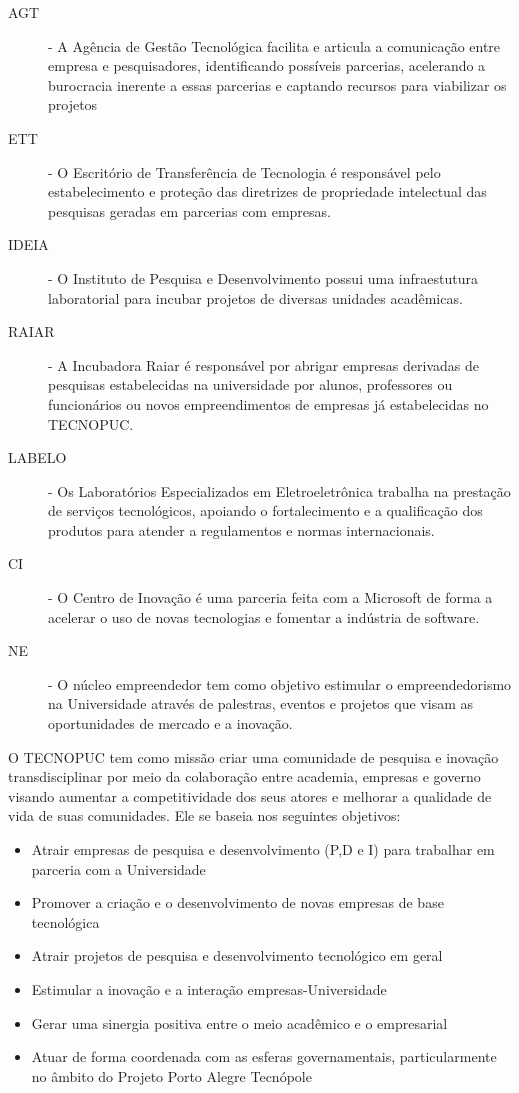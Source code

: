 \begin{description}
\item[AGT] - A Agência de Gestão Tecnológica facilita e articula a comunicação entre empresa e pesquisadores, identificando possíveis parcerias, acelerando a burocracia inerente a essas parcerias e captando recursos para viabilizar os projetos
\item[ETT] - O Escritório de Transferência de Tecnologia é responsável pelo estabelecimento e proteção das diretrizes de propriedade intelectual das pesquisas geradas em parcerias com empresas.
\item[IDEIA] - O Instituto de Pesquisa e Desenvolvimento possui uma infraestutura laboratorial para incubar projetos de diversas unidades acadêmicas.
\item[RAIAR] - A Incubadora Raiar é responsável por abrigar empresas derivadas de pesquisas estabelecidas na universidade por alunos, professores ou funcionários ou novos empreendimentos de empresas já estabelecidas no TECNOPUC.
\item[LABELO] - Os Laboratórios Especializados em Eletroeletrônica trabalha na prestação de serviços tecnológicos, apoiando o fortalecimento e a qualificação dos produtos para atender a regulamentos e normas internacionais.
\item[CI] - O Centro de Inovação é uma parceria feita com a Microsoft de forma a acelerar o uso de novas tecnologias e fomentar a indústria de software.
\item[NE] - O núcleo empreendedor tem como objetivo estimular o empreendedorismo na Universidade através de palestras, eventos e projetos que visam as oportunidades de mercado e a inovação.
\end{description}

O TECNOPUC tem como missão criar uma comunidade de pesquisa e inovação transdisciplinar por meio da colaboração entre academia, empresas e governo visando aumentar a competitividade dos seus atores e melhorar a qualidade de vida de suas comunidades. Ele se baseia nos seguintes objetivos:

\begin{itemize}
\item Atrair empresas de pesquisa e desenvolvimento (P,D e I) para trabalhar em parceria com a Universidade
\item Promover a criação e o desenvolvimento de novas empresas de base tecnológica
\item Atrair projetos de pesquisa e desenvolvimento tecnológico em geral
\item Estimular a inovação e a interação empresas-Universidade
\item Gerar uma sinergia positiva entre o meio acadêmico e o empresarial
\item Atuar de forma coordenada com as esferas governamentais, particularmente no âmbito do Projeto Porto Alegre Tecnópole
\end{itemize}

